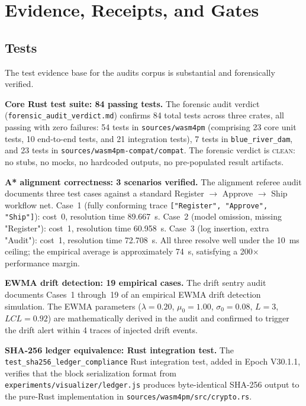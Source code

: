 
\section{Evidence, Receipts, and Gates}
\label{sec:audits-evidence}

\subsection{Tests}
\label{sec:audits-evidence-tests}

The test evidence base for the audits corpus is substantial and forensically
verified.

\textbf{Core Rust test suite: 84 passing tests.} The forensic audit verdict
(\texttt{forensic\_audit\_verdict.md}) confirms 84 total tests across three
crates, all passing with zero failures: 54 tests in \texttt{sources/wasm4pm}
(comprising 23 core unit tests, 10 end-to-end tests, and 21 integration tests),
7 tests in \texttt{blue\_river\_dam}, and 23 tests in
\texttt{sources/wasm4pm-compat/compat}. The forensic verdict is \textsc{clean}:
no stubs, no mocks, no hardcoded outputs, no pre-populated result artifacts.

\textbf{A* alignment correctness: 3 scenarios verified.} The alignment referee
audit documents three test cases against a standard Register $\to$ Approve $\to$
Ship workflow net. Case~1 (fully conforming trace \texttt{["Register", "Approve",
"Ship"]}): cost~0, resolution time 89.667~\textmu s. Case~2 (model omission,
missing "Register"): cost~1, resolution time 60.958~\textmu s. Case~3 (log
insertion, extra "Audit"): cost~1, resolution time 72.708~\textmu s. All three
resolve well under the 10~ms ceiling; the empirical average is approximately
74~\textmu s, satisfying a 200$\times$ performance margin.

\textbf{EWMA drift detection: 19 empirical cases.} The drift sentry audit
documents Cases~1 through~19 of an empirical EWMA drift detection simulation.
The EWMA parameters (\(\lambda = 0.20\), \(\mu_0 = 1.00\), \(\sigma_0 = 0.08\),
\(L = 3\), \(LCL = 0.92\)) are mathematically derived in the audit and confirmed
to trigger the drift alert within 4 traces of injected drift events.

\textbf{SHA-256 ledger equivalence: Rust integration test.} The
\texttt{test\_sha256\_ledger\_compliance} Rust integration test, added in Epoch
V30.1.1, verifies that the block serialization format from
\texttt{experiments/visualizer/ledger.js} produces byte-identical SHA-256 output
to the pure-Rust implementation in \texttt{sources/wasm4pm/src/crypto.rs}.

